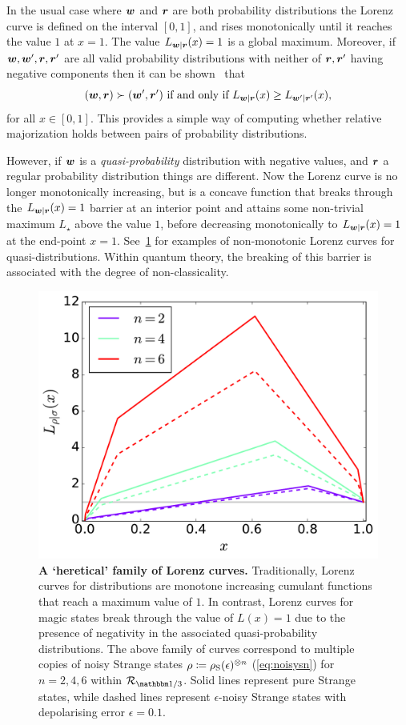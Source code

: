 \documentclass[pra,
aps,
twocolumn,
superscriptaddress,
groupedaddress,
nofootinbib,
reprint
]{revtex4-1}
\begin{document}
In the usual case where $\boldsymbol{w}$ and $\boldsymbol{r}$ are both probability distributions the Lorenz curve is defined on the interval $[0,1]$, and rises monotonically until it reaches the value $1$ at $x=1$. The value $L_{\boldsymbol{w}|\boldsymbol{r}}(x) = 1$ is a global maximum. Moreover, if $\boldsymbol{w}, \boldsymbol{w}', \boldsymbol{r}, \boldsymbol{r}'$ are all valid probability distributions with neither of $\boldsymbol{r},\boldsymbol{r}'$ having negative components then it can be shown~\cite{ruch_mixing_1978} that
\begin{equation}
(\boldsymbol{w}, \boldsymbol{r}) \succ (\boldsymbol{w}', \boldsymbol{r}') \mbox{ if and only if } L_{\boldsymbol{w} |\boldsymbol{r}}(x) \ge L_{\boldsymbol{w}' |\boldsymbol{r}'}(x),
\end{equation}
for all $x \in [0,1]$.
This provides a simple way of computing whether relative majorization holds between pairs of probability distributions.

However, if $\boldsymbol{w}$ is a \emph{quasi-probability} distribution with negative values, and $\boldsymbol{r}$ a regular probability distribution things are different. Now the Lorenz curve is no longer monotonically increasing, but is a concave function that breaks through the $L_{\boldsymbol{w}|\boldsymbol{r}}(x) = 1$ barrier at an interior point and attains some non-trivial maximum $L_\star$ above the value $1$, before decreasing monotonically to $L_{\boldsymbol{w}|\boldsymbol{r}}(x)= 1$ at the end-point $x=1$. See~\cref{fig:lcs} for examples of non-monotonic Lorenz curves for quasi-distributions. Within quantum theory, the breaking of this barrier is associated with the degree of non-classicality.

\begin{figure}
    \centering
    \includegraphics[scale=0.35]{figs/lc_strange.pdf}
    \caption{\textbf{A `heretical' family of Lorenz curves.} Traditionally, Lorenz curves for distributions are monotone increasing cumulant functions that reach a maximum value of $1$. In contrast, Lorenz curves for magic states break through the value of $L(x)=1$ due to the presence of negativity in the associated quasi-probability distributions. The above family of curves correspond to multiple copies of noisy Strange states $\rho\coloneqq\rho_{\rm{S}}(\epsilon)^{\otimes n}$ (\cref{eq:noisysn}) for $n=2,4,6$ within $\R_{\id/3}$. Solid lines represent pure Strange states, while dashed lines represent $\epsilon$-noisy Strange states with depolarising error $\epsilon = 0.1$.
    }
    \label{fig:lcs}
\end{figure}
\end{document}
